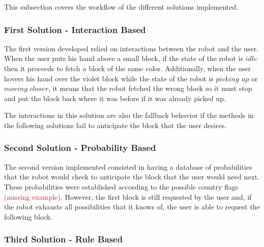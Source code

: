 This subsection covers the workflow of the different solutions implemented.

\subsubsection{First Solution - Interaction Based}

The first version developed relied on interactions between the robot and the user. When the user puts his hand above a small block, if the state of the robot is $idle$ then it proceeds to fetch a block of the same color. Additionally, when the user hovers his hand over the violet block while the state of the robot is $picking$ $up$ or $moving$ $closer$, it means that the robot fetched the wrong block so it must stop and put the block back where it was before if it was already picked up.

The interactions in this solution are also the fallback behavior if the methods in the following solutions fail to anticipate the block that the user desires.

\subsubsection{Second Solution - Probability Based}

The second version implemented consisted in having a database of probabilities that the robot would check to anticipate the block that the user would need next. These probabilities were established according to the possible country flags \textcolor{red}{(missing example)}. However, the first block is still requested by the user and, if the robot exhausts all possibilities that it knows of, the user is able to request the following block.

\subsubsection{Third Solution - Rule Based}
